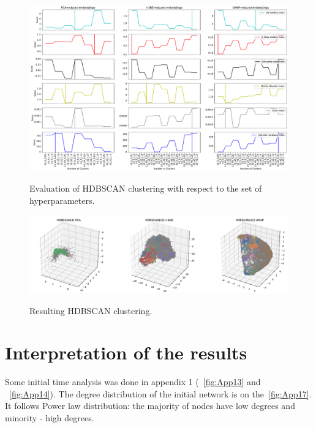 \begin{figure}[!ht]
	\centering
	\includegraphics[width=1.0\textwidth]{images/appendix/App11.pdf}\\
	\caption{Evaluation of HDBSCAN clustering with respect to the set of hyperparameters.}
	\label{fig:App11}
\end{figure}
\begin{figure}[!ht]
	\centering
	\includegraphics[width=1.0\textwidth]{images/appendix/App12.pdf}\\
	\caption{Resulting HDBSCAN clustering.}
	\label{fig:App12}
\end{figure}

\section{Interpretation of the results}
Some initial time analysis was done in appendix 1 (~\autoref{fig:App13} and ~\autoref{fig:App14}). The degree distribution of the initial network is on the~\autoref{fig:App17}. It follows Power law distribution: the majority of nodes have low degrees and minority - high degrees.

